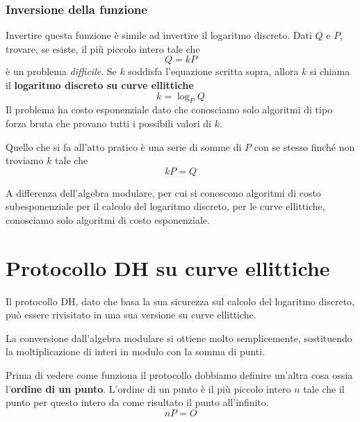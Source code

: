 \subsubsection{Inversione della funzione}
Invertire questa funzione \`e simile ad invertire il logaritmo discreto. Dati $Q$ e $P$, trovare, se esiste, il
pi\`u piccolo intero tale che
\[ Q = kP \]
\`e un problema \emph{difficile}. Se $k$ soddisfa l'equazione scritta sopra, allora $k$ si chiama il
\textbf{logaritmo discreto su curve ellittiche}
\[ k = \log_P Q \]
Il problema ha costo esponenziale dato che conosciamo solo algoritmi di tipo forza bruta che provano tutti i
possibili valori di $k$.

Quello che si fa all'atto pratico \`e una serie di somme di $P$ con se stesso finch\'e non troviamo $k$ tale che
\[ kP = Q \]

A differenza dell'algebra modulare, per cui si conoscono algoritmi di costo subesponenziale per il calcolo del
logaritmo discreto, per le curve ellittiche, conosciamo solo algoritmi di costo esponenziale.

\section{Protocollo DH su curve ellittiche}
Il protocollo DH, dato che basa la sua sicurezza sul calcolo del logaritmo discreto, pu\`o essere rivisitato in
una sua versione su curve ellittiche.

La conversione dall'algebra modulare si ottiene molto semplicemente, sostituendo la moltiplicazione di interi in
modulo con la somma di punti.

Prima di vedere come funziona il protocollo dobbiamo definire un'altra cosa ossia l'\textbf{ordine di un punto}.
L'ordine di un punto \`e il pi\`u piccolo intero $n$ tale che il punto per questo intero da come risultato il
punto all'infinito.
\[ nP = O \]

